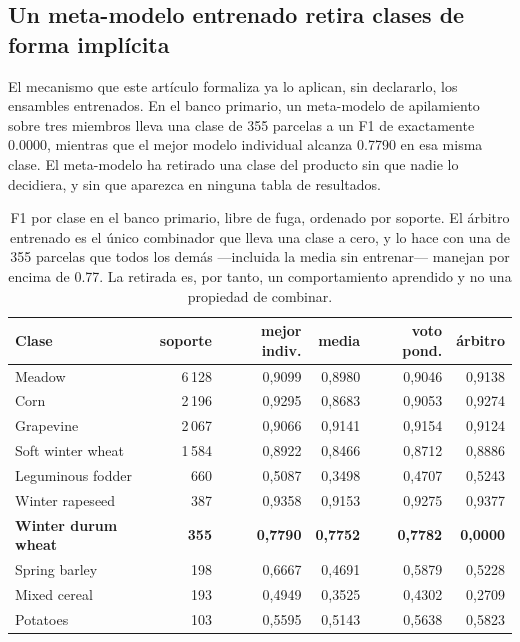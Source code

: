 \subsection{Un meta-modelo entrenado retira clases de forma implícita}
\label{sec:arbitro}

El mecanismo que este artículo formaliza ya lo aplican, sin declararlo, los ensambles entrenados.
En el banco primario, un meta-modelo de apilamiento sobre tres miembros lleva una clase de
\num{355} parcelas a un F1 de exactamente \num{0.0000}, mientras que el mejor modelo individual
alcanza \num{0.7790} en esa misma clase. El meta-modelo ha retirado una clase del producto sin que
nadie lo decidiera, y sin que aparezca en ninguna tabla de resultados.

\begin{table}[tbp]
\caption{F1 por clase en el banco primario, libre de fuga, ordenado por soporte. El árbitro
entrenado es el único combinador que lleva una clase a cero, y lo hace con una de \num{355}
parcelas que todos los demás —incluida la media sin entrenar— manejan por encima de \num{0.77}.
La retirada es, por tanto, un comportamiento aprendido y no una propiedad de combinar.}
\label{tab:porclase}
\centering
\footnotesize
\setlength{\tabcolsep}{4.5pt}
\begin{tabular}{lrrrrr}
\toprule
Clase & soporte & mejor indiv. & media & voto pond. & árbitro \\
\midrule
Meadow & 6\,128 & 0,9099 & 0,8980 & 0,9046 & 0,9138 \\
Corn & 2\,196 & 0,9295 & 0,8683 & 0,9053 & 0,9274 \\
Grapevine & 2\,067 & 0,9066 & 0,9141 & 0,9154 & 0,9124 \\
Soft winter wheat & 1\,584 & 0,8922 & 0,8466 & 0,8712 & 0,8886 \\
Leguminous fodder & 660 & 0,5087 & 0,3498 & 0,4707 & 0,5243 \\
Winter rapeseed & 387 & 0,9358 & 0,9153 & 0,9275 & 0,9377 \\
\textbf{Winter durum wheat} & \textbf{355} & \textbf{0,7790} & \textbf{0,7752} & \textbf{0,7782} & \textbf{0,0000} \\
Spring barley & 198 & 0,6667 & 0,4691 & 0,5879 & 0,5228 \\
Mixed cereal & 193 & 0,4949 & 0,3525 & 0,4302 & 0,2709 \\
Potatoes & 103 & 0,5595 & 0,5143 & 0,5638 & 0,5823 \\
\bottomrule
\end{tabular}
\end{table}

